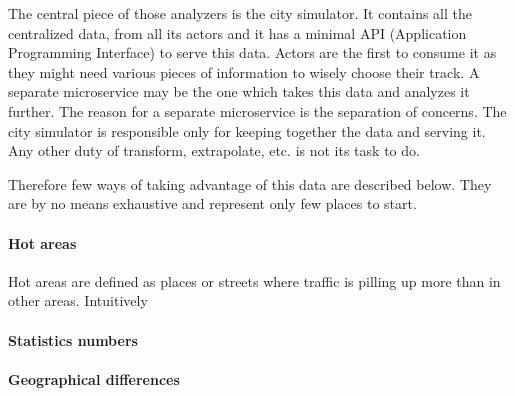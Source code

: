 \documentclass[a4paper,12pt,twoside]{book}
\begin{document}
The central piece of those analyzers is the city simulator. It contains all the centralized data, from all its actors and it has a minimal API (Application Programming Interface) to serve this data. Actors are the first to consume it as they might need various pieces of information to wisely choose their track. A separate microservice may be the one which takes this data and analyzes it further. The reason for a separate microservice is the separation of concerns. The city simulator is responsible only for keeping together the data and serving it. Any other duty of transform, extrapolate, etc. is not its task to do.

Therefore few ways of taking advantage of this data are described below. They are by no means exhaustive and represent only few places to start.

\paragraph{Hot areas}

Hot areas are defined as places or streets where traffic is pilling up more than in other areas. Intuitively

\paragraph{Statistics numbers}

\paragraph{Geographical differences}


\end{document}
